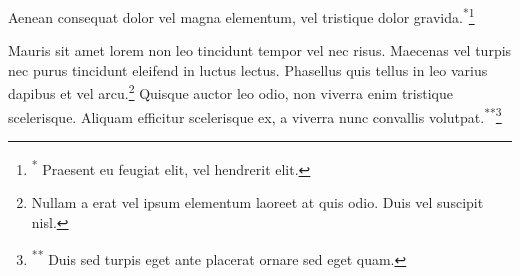 Aenean consequat dolor vel magna elementum, vel tristique dolor gravida.\let\svthefootnote\thefootnote\let\thefootnote\relax\textsuperscript{*}\footnote{\textsuperscript{*} Praesent eu feugiat elit, vel hendrerit elit.}\addtocounter{footnote}{-1}\let\thefootnote\svthefootnote Mauris sit amet lorem non leo tincidunt tempor vel nec risus. Maecenas vel turpis nec purus tincidunt eleifend in luctus lectus. Phasellus quis tellus in leo varius dapibus et vel arcu.\footnote{Nullam a erat vel ipsum elementum laoreet at quis odio.  Duis vel suscipit nisl.} Quisque auctor leo odio, non viverra enim tristique scelerisque. Aliquam efficitur scelerisque ex, a viverra nunc convallis volutpat.\let\svthefootnote\thefootnote\let\thefootnote\relax\textsuperscript{**}\footnote{\textsuperscript{**} Duis sed turpis eget ante placerat ornare sed eget quam.}\addtocounter{footnote}{-1}\let\thefootnote\svthefootnote